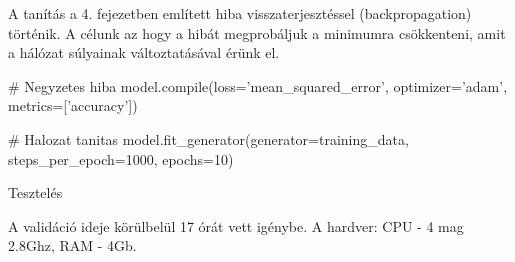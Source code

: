 A tanítás a 4. fejezetben említett hiba visszaterjesztéssel (backpropagation) történik. A célunk az hogy a hibát megprobáljuk a minimumra csökkenteni, amit a hálózat súlyainak változtatásával érünk el.

\begin{python}
# Negyzetes hiba
model.compile(loss='mean_squared_error',
              optimizer='adam',
              metrics=['accuracy'])

# Halozat tanitas
model.fit_generator(generator=training_data,
                    steps_per_epoch=1000, epochs=10)
\end{python}

Tesztelés

A validáció ideje körülbelül 17 órát vett igénybe. A hardver: CPU - 4 mag 2.8Ghz, RAM - 4Gb.